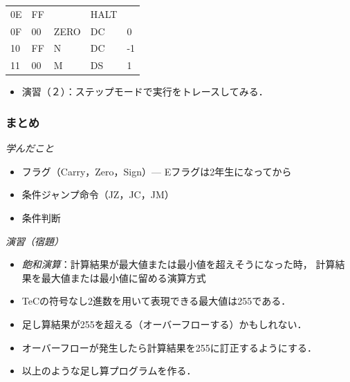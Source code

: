 \documentclass[handout]{beamer}        %
\begin{document}
\begin{frame}
\begin{minipage}{0.5\columnwidth}
{\begin{center}
\begin{tabular}{|l|l|l|l l|}
        0E & FF    &      & HALT &         \\
        0F & 00    & ZERO & DC   & 0       \\
        10 & FF    & N    & DC   & -1      \\
        11 & 00    & M    & DS   & 1       \\
        \hline
      \end{tabular}
    \end{center}}
  \end{minipage}
  \vfill
  \begin{itemize}
  \item 演習（２）：ステップモードで実行をトレースしてみる．
  \end{itemize}
\end{frame}

\begin{frame}
  \frametitle{まとめ}
  \emph{学んだこと}
  \begin{itemize}
  \item フラグ（Carry，Zero，Sign）--- Eフラグは2年生になってから
  \item 条件ジャンプ命令（JZ，JC，JM）
  \item 条件判断
  \end{itemize}
  \vfill

  \emph{演習（宿題）}
  \begin{itemize}
  \item \emph{飽和演算}：計算結果が最大値または最小値を超えそうになった時，
    計算結果を最大値または最小値に留める演算方式
  \item TeCの符号なし2進数を用いて表現できる最大値は255である．
  \item 足し算結果が255を超える（オーバーフローする）かもしれない．
  \item オーバーフローが発生したら計算結果を255に訂正するようにする．
  \item 以上のような足し算プログラムを作る．
  \end{itemize}
  \vfill
\end{frame}
\end{document}
